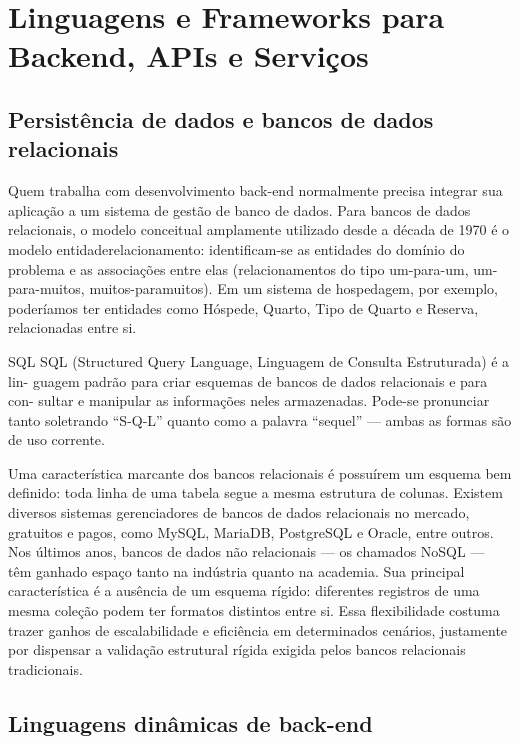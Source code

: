 \chapter{Linguagens e Frameworks para Backend, APIs e Serviços}

\section{Persistência de dados e bancos de dados relacionais}

Quem trabalha com desenvolvimento back-end normalmente precisa integrar sua aplicação a um sistema de gestão de banco de dados. Para bancos de dados relacionais, o modelo conceitual amplamente utilizado desde a década de 1970 é o modelo entidaderelacionamento: identificam-se as entidades do domínio do problema e as associações entre elas (relacionamentos do tipo um-para-um, um-para-muitos, muitos-paramuitos). Em um sistema de hospedagem, por exemplo, poderíamos ter entidades como Hóspede, Quarto, Tipo de Quarto e Reserva, relacionadas entre si.

\begin{codebox}{SQL}
 SQL (Structured Query Language, Linguagem de Consulta Estruturada) é a lin-
 guagem padrão para criar esquemas de bancos de dados relacionais e para con-
 sultar e manipular as informações neles armazenadas. Pode-se pronunciar tanto
 soletrando “S-Q-L” quanto como a palavra “sequel” — ambas as formas são de
 uso corrente.
\end{codebox}

Uma característica marcante dos bancos relacionais é possuírem um esquema bem definido: toda linha de uma tabela segue a mesma estrutura de colunas. Existem diversos sistemas gerenciadores de bancos de dados relacionais no mercado, gratuitos e pagos, como MySQL, MariaDB, PostgreSQL e Oracle, entre outros. Nos últimos anos, bancos de dados não relacionais — os chamados NoSQL — têm ganhado espaço tanto na indústria quanto na academia. Sua principal característica é a ausência de um esquema rígido: diferentes registros de uma mesma coleção podem ter formatos distintos entre si. Essa flexibilidade costuma trazer ganhos de escalabilidade e eficiência em determinados cenários, justamente por dispensar a validação estrutural rígida exigida pelos bancos relacionais tradicionais.

\section{Linguagens dinâmicas de back-end}

